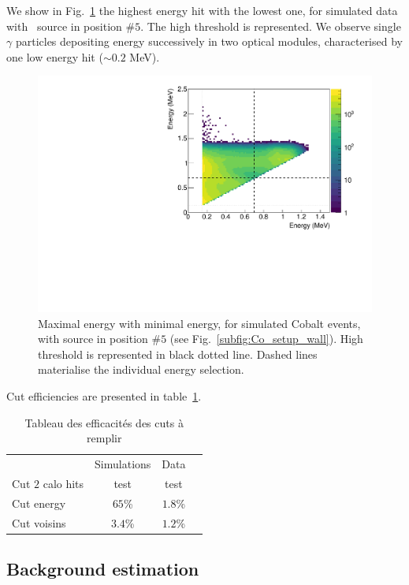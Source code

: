 We show in Fig.~\ref{fig:Co_energy_cut} the highest energy hit with the lowest one, for simulated data with \Co\ source in position $\#5$.
The high threshold is represented.
We observe single $\gamma$ particles depositing energy successively in two optical modules, characterised by one low energy hit ($\sim 0.2$ MeV).
\begin{figure}[h]
  \centering
  \includegraphics[width=14cm]{commissioning/fig_commissioning/Co_energy_cut.pdf}
  \caption{Maximal energy with minimal energy, for simulated Cobalt events, with source in position $\#5$ (see Fig.~\ref{subfig:Co_setup_wall}).
    High threshold is represented in black dotted line.
    Dashed lines materialise the individual energy selection.
\label{fig:Co_energy_cut}}
\end{figure}

Cut efficiencies are presented in table~\ref{tab:Co_cut_eff}.
\begin{table}[h]
  \centering

  \begin{tabular}{ l c c c }
    & Simulations & Data \\
    Cut $2$ calo hits & test & test \\
    Cut energy & $65$\% & $1.8$\% \\
    Cut voisins & $3.4$\% & $1.2$\% \\
  \end{tabular}
  \caption{Tableau des efficacités des cuts à remplir
    \label{tab:Co_cut_eff}}
\end{table}



\subsection{Background estimation}
\label{subsec:bkg_estimation}

